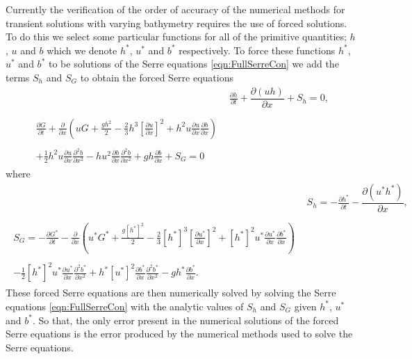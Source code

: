 Currently the verification of the order of accuracy of the numerical methods for transient solutions with varying bathymetry requires the use of forced solutions. To do this we select some particular functions for all of the primitive quantities; $h$, $u$ and $b$ which we denote $h^*$, $u^*$ and $b^*$ respectively. To force these functions $h^*$, $u^*$ and $b^*$ to be solutions of the Serre equations \eqref{eqn:FullSerreCon} we add the terms $S_h$ and $S_G$ to obtain the forced Serre equations
\begin{subequations}
	\label{eqn:FullSerreConForced}
	\begin{align}
	& \frac{\partial h}{\partial t} + \dfrac{\partial (uh)}{\partial x} + S_{h}  = 0 ,\label{eqn:FullSerreConMassForced}  \\ \nonumber \\
	\begin{split}
	\label{eqn:SerreconsconmomForced}
	\frac{\partial G}{\partial t}  + \frac{\partial}{\partial x} \left( {u} G + \frac{gh^2}{2} - \frac{2}{3}h^3 \left[ \frac{\partial {u}}{\partial x} \right]^2 + h^2 {u}\frac{\partial {u}}{\partial x}\frac{\partial b}{\partial x} \right) \\ \\ + \frac{1}{2}h^2 {u} \frac{\partial {u}}{\partial x} \frac{\partial^2 b}{\partial x^2}  - h {u}^2\frac{\partial b}{\partial x}\frac{\partial^2 b}{\partial x^2} + gh\frac{\partial b}{\partial x} + S_{G} = 0
	\end{split}
	\end{align}
\end{subequations}
where
\begin{align*}
&  S_{h} = -\frac{\partial h^*}{\partial t} - \dfrac{\partial (u^*h^*)}{\partial x} ,  \\ \nonumber \\
\begin{split}
S_{G} = -\frac{\partial G^*}{\partial t}  - \frac{\partial}{\partial x} \left( {u}^* G^* + \frac{g\left[h^*\right]^2}{2} - \frac{2}{3}\left[h^*\right]^3 \left[\frac{\partial {u}^*}{\partial x}\right]^2 + \left[h^*\right]^2 {u^*}\frac{\partial {u}^*}{\partial x}\frac{\partial b^*}{\partial x} \right) \\ \\ - \frac{1}{2}\left[h^*\right]^2 {u}^* \frac{\partial {u}^*}{\partial x} \frac{\partial^2 b^*}{\partial x^2}  + h^* {\left[u^*\right]}^2\frac{\partial b^*}{\partial x}\frac{\partial^2 b^*}{\partial x^2} - gh^*\frac{\partial b^*}{\partial x}.
\end{split}
\end{align*} 
These forced Serre equations are then numerically solved by solving the Serre equations \eqref{eqn:FullSerreCon} with the analytic values of $S_{h}$ and $S_{G}$ given $h^*$, $u^*$ and $b^*$. So that, the only error present in the numerical solutions of the forced Serre equations is the error produced by the numerical methods used to solve the Serre equations.

